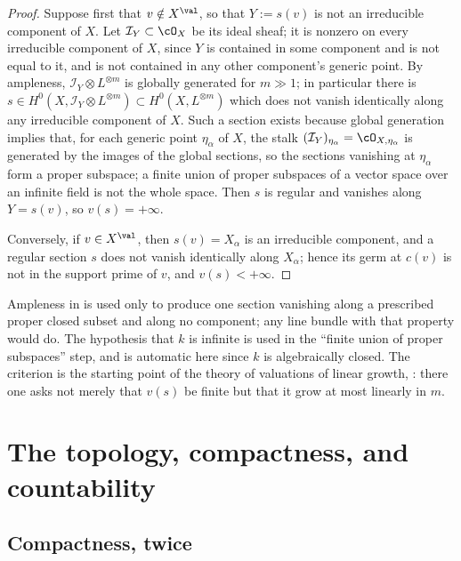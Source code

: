 \begin{proof}
Suppose first that $v\notin X^{\val}$, so that $Y:=s(v)$ is not an
irreducible component of $X$.  Let $\mathcal I_Y\subset\cO_X$ be its
ideal sheaf; it is nonzero on every irreducible component of $X$, since
$Y$ is contained in some component and is not equal to it, and is not
contained in any other component's generic point.  By ampleness,
$\mathcal I_Y\otimes L^{\otimes m}$ is globally generated for $m\gg1$; in
particular there is $s\in H^0(X,\mathcal I_Y\otimes L^{\otimes m})
\subset H^0(X,L^{\otimes m})$ which does not vanish identically along any
irreducible component of $X$.  Such a section exists because global
generation implies that, for each generic point $\eta_\alpha$ of $X$, the
stalk $(\mathcal I_Y)_{\eta_\alpha}=\cO_{X,\eta_\alpha}$ is generated by
the images of the global sections, so the sections vanishing at
$\eta_\alpha$ form a proper subspace; a finite union of proper subspaces of
a vector space over an infinite field is not the whole space.  Then $s$ is
regular and vanishes along $Y=s(v)$, so $v(s)=+\infty$.

Conversely, if $v\in X^{\val}$, then $s(v)=X_\alpha$ is an irreducible
component, and a regular section $s$ does not vanish identically along
$X_\alpha$; hence its germ at $c(v)$ is not in the support prime of
$v$, and $v(s)<+\infty$.
\end{proof}

\begin{remark}
\label{rem:ch32-valuation-criterion-scope}
Ampleness in  is used only to produce one
section vanishing along a prescribed proper closed subset and along no
component; any line bundle with that property would do.  The hypothesis that
$k$ is infinite is used in the ``finite union of proper subspaces''
step, and is automatic here since $k$ is algebraically closed.  The
criterion is the starting point of the theory of valuations of linear
growth, : there one asks not merely that
$v(s)$ be finite but that it grow at most linearly in $m$.
\end{remark}

\section{The topology, compactness, and countability}
\label{sec:ch32-topology}

\subsection{Compactness, twice}
\label{sec:ch32-compactness}

